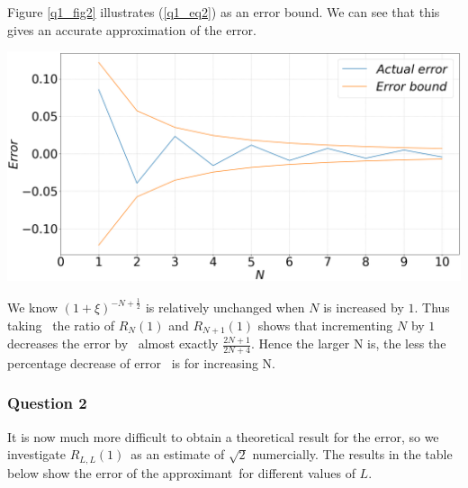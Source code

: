 \documentclass[12pt, a4paper]{article}
\begin{document}
Figure \ref{q1_fig2} illustrates (\ref{q1_eq2}) as an error bound. 
We can see that this gives an accurate approximation of the error.

\vspace{0.3cm}
\begin{minipage}{\textwidth}
	\includegraphics[width=\linewidth]{q1_fig2}
	\label{q1_fig2}
\end{minipage}
\vspace{0.4cm}

We know $(1+\xi)^{-N + \frac{1}{2}}$ is relatively unchanged when $N$ is increased by $1$. Thus taking \
the ratio of $R_{N}(1)$ and $R_{N+1}(1)$ shows that incrementing $N$ by $1$ decreases the error by \
almost exactly $\frac{ 2N+1 }{ 2N+4 }$. Hence the larger N is, the less the percentage decrease of error \
is for increasing N.


\subsubsection*{Question 2}

It is now much more difficult to obtain a theoretical result for the error, so we investigate $R_{L,L}(1)$\
as an estimate of $\sqrt{2}$ numercially. The results in the table below show the error of the approximant\
for different values of $L$.
\vspace{0.3cm}
\end{document}
